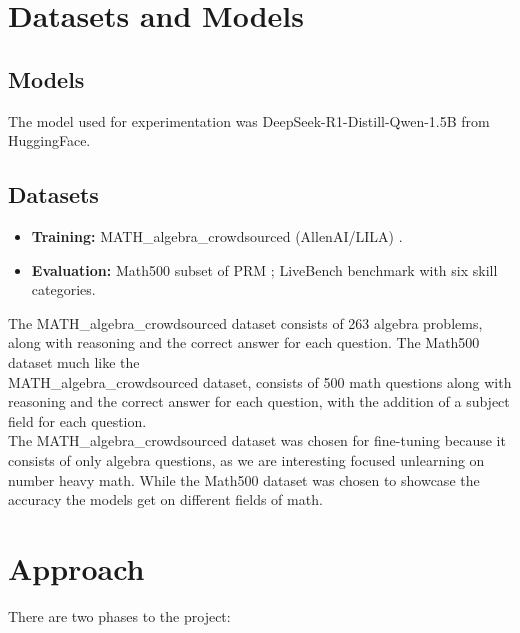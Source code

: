 \documentclass[10.5pt]{article}
\begin{document}
\section{Datasets and Models}
\subsection{Models}
The model used for experimentation was DeepSeek-R1-Distill-Qwen-1.5B from HuggingFace.
\subsection{Datasets}
\begin{itemize}
  \item \textbf{Training:} MATH\_algebra\_crowdsourced (AllenAI/LILA) \cite{mishra2022lila}.
  \item \textbf{Evaluation:} Math500 subset of PRM \cite{lightman2023lets}; LiveBench benchmark with six skill categories.
\end{itemize}
The MATH\_algebra\_crowdsourced dataset consists of 263 algebra problems, along with reasoning and the correct answer for each question. The Math500 dataset much like the 
\\MATH\_algebra\_crowdsourced dataset, consists of 500 math questions along with reasoning and the correct answer for each question, with the addition of a subject field for each question.
\\
The MATH\_algebra\_crowdsourced dataset was chosen for fine-tuning because it consists of only algebra questions, as we are interesting focused unlearning on number heavy math. While the Math500 dataset was chosen to showcase the accuracy the models get on different fields of math.

\section{Approach}
There are two phases to the project:
\end{document}
